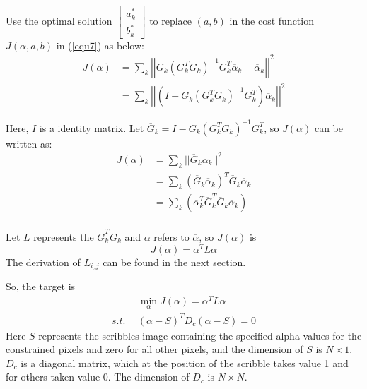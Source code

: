 \documentclass[journal]{IEEEtran}
\begin{document}
Use the optimal solution $\begin{bmatrix} a_{k}^{*} \\ b_{k}^{*} \end{bmatrix}$ to replace $(a, b)$ in the cost function $J(\alpha, a, b)$ in (\ref{equ7}) as below:
\begin{equation}
    \begin{aligned}
        J(\alpha) &= \sum\limits_{k} \left|\left| G_{k}(G_{k}^{T}G_{k})^{-1}G_{k}^{T}\overline{\alpha}_k - \overline{\alpha}_k \right|\right|^2 \\ 
        &= \sum\limits_{k} \left|\left| (I - G_{k}(G_{k}^{T}G_{k})^{-1}G_{k}^{T})\overline{\alpha}_k \right|\right|^2
    \end{aligned}
    \label{equ13}
\end{equation}

Here, $I$ is a identity matrix. 
Let $\overline{G}_{k} = I -  G_{k}(G_{k}^{T}G_{k})^{-1}G_{k}^{T} $, so $J(\alpha)$ can be written as:
\begin{equation}
    \begin{aligned}
        J(\alpha) &= \sum\limits_{k} || \overline{G}_k \overline{\alpha}_k ||^2 \\
                  &= \sum\limits_{k} (\overline{G}_k \overline{\alpha}_k)^T\overline{G}_k \overline{\alpha}_k \\
                  &= \sum\limits_{k} (\overline{\alpha}_k^T\overline{G}_k^T\overline{G}_k\overline{\alpha}_k ) \\
    \end{aligned}
    \label{equ14}
\end{equation}  

Let $L$ represents the $\overline{G}_k^T\overline{G}_k$ and $\alpha$ refers to $\overline{\alpha}$, so $J(\alpha)$ is 
\begin{equation}
    J(\alpha) = \alpha^T L \alpha
    \label{equ15}
\end{equation}
The derivation of $L_{i,j}$ can be found in the next section.

So, the target is 
\begin{equation}
    \begin{aligned}
        & \min\limits_{\alpha} J(\alpha) = \alpha^{T} L \alpha \\
        s.t.~~&(\alpha - S)^{T} D_c (\alpha - S) = 0
    \end{aligned}
    \label{equ16}
\end{equation}
Here $S$ represents the scribbles image containing the specified alpha values for the constrained pixels and zero for all other pixels, and the dimension of $S$ is $N\times 1$. $D_c$ is a diagonal matrix, which at the position of the scribble takes value 1 and for others taken value 0. The dimension of $D_c$ is $N\times N$.
\end{document}

